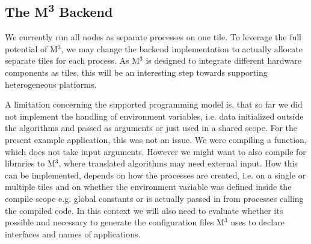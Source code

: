 \begin{figure}[H]
\centering
\tabskip=0pt
\caption{}
\label{fig:DFBranching}
\end{figure}

\subsection{The M\textsuperscript{3} Backend}

We currently run all nodes as separate processes on one tile. To leverage the full potential of M$^3$, we may change the backend implementation to actually allocate separate tiles for each process. As M$^3$ is designed to integrate different hardware components as tiles, this will be an interesting step towards supporting heterogeneous platforms. 

A limitation concerning the supported programming model is, that so far we did not implement the handling of environment variables, i.e. data initialized outside the algorithms and passed as arguments or just used in a shared scope. For the present example application, this was not an issue. We were compiling a  function, which does not take input arguments. However we might want to also compile for libraries to M$^3$, where translated algorithms may need external input. How this can be implemented, depends on how the processes are created, i.e. on a single or multiple tiles and on whether the environment variable was defined inside the compile scope e.g. global constants or is actually passed in from processes calling the compiled code. In this context we will also need to evaluate whether its possible and necessary to generate the  configuration files M$^3$ uses to declare interfaces and names of applications.  


